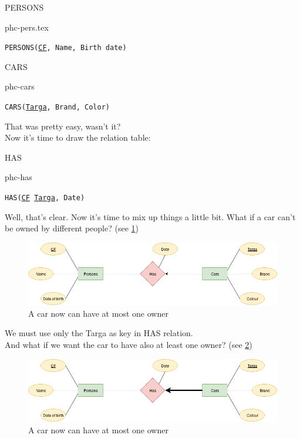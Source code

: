 \documentclass[class=book, crop=false, oneside]{standalone}
\begin{document}
\begin{minipage}{0.45\textwidth}
	PERSONS
	\begin{table}[H]
		\centering
		{phc-pers.tex}
	\end{table}
	\texttt{PERSONS(\underline{CF}, Name, Birth date)}
\end{minipage}
\hspace{.1\textwidth}
\begin{minipage}{.45\textwidth}
	CARS
	\begin{table}[H]
		\centering
		{phc-cars}
	\end{table}
	\texttt{CARS(\underline{Targa}, Brand, Color)}
\end{minipage}
\vskip 20pt
That was pretty easy, wasn't it?\\
Now it's time to draw the relation table:
\vskip 20pt
\begin{minipage}{.7\textwidth}
	HAS
	\begin{table}[H]
		{phc-has}
	\end{table}
	\texttt{HAS(\underline{CF} \underline{Targa}, Date)}
\end{minipage}
\vskip 20pt
Well, that's clear. Now it's time to mix up things a little bit.
What if a car can't be owned by different people? (see \ref{diagram1_01})
\begin{figure}[H]
	\centering
	\includegraphics[width=\textwidth,keepaspectratio]{diagram1_01.png}
	\caption{A car now can have at most one owner}
	\label{diagram1_01}
\end{figure}
We must use only the Targa as key in HAS relation.
\\
And what if we want the car to have also at least one owner? (see \ref{diagram1_02})
\begin{figure}[H]
	\centering
	\includegraphics[width=\textwidth,keepaspectratio]{diagram1_02.png}
	\caption{A car now can have at most one owner}
	\label{diagram1_02}
\end{figure}
\end{document}

